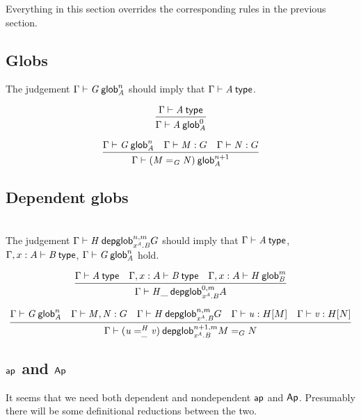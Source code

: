 Everything in this section overrides the corresponding rules in the previous
section.

\subsection{Globs}

The judgement $\text{\ensuremath{\Gamma}} \vdash \mathit{G} \: \mathsf{glob}^{n}_{\mathit{A}}$ should imply that
$\text{\ensuremath{\Gamma}} \vdash \mathit{A} \: \mathsf{type}$.

\begin{small}
  \[\infer{\wfglob{\Gamma}{A}{0}{A}} {\wftype{\Gamma}{A}}\]

  \[\infer{\wfglob{\Gamma}{(\homj{G}{M}{N})}{n+1}{A}} {\wfglob{\Gamma}{G}{n}{A}
    & \ofglob{\Gamma}{M}{G} & \ofglob{\Gamma}{N}{G}}\]
\end{small}

\subsection{Dependent globs}

\\

The judgement $\text{\ensuremath{\Gamma}} \vdash \mathit{H} \: \mathsf{depglob}^{n,m}_{\mathit{x^A.B}}{G}$ should imply that
$\text{\ensuremath{\Gamma}} \vdash \mathit{A} \: \mathsf{type}$, $\text{\ensuremath{\Gamma,x:A}} \vdash \mathit{B} \: \mathsf{type}$, $\text{\ensuremath{\Gamma}} \vdash \mathit{G} \: \mathsf{glob}^{n}_{\mathit{A}}$ hold.

\begin{small}
  \[\infer{\wfdepglob{\Gamma}{H\blank}{0,m}{x^A.B}{A}}
  {\wftype{\Gamma}{A}
    & \wftype{\Gamma,x:A}{B}
    & \wfglob{\Gamma,x:A}{H}{m}{B}
  }\]

  \[\infer{\wfdepglob{\Gamma}{(\dhomj{H}{u}{v}{\blank})}{n+1,m}
    {x^A.B}{\homj{G}{M}{N}}} {\wfglob{\Gamma}{G}{n}{A} &
    \ofglob{\Gamma}{M,N}{G}
    & \wfdepglob{\Gamma}{H}{n,m}{x^A.B}{G} & \ofdepglob{\Gamma}{u}{H}{M} &
    \ofdepglob{\Gamma}{v}{H}{N} }\]
\end{small}

\subsection{$\mathsf{ap}$ and $\mathsf{Ap}$}

It seems that we need both dependent and nondependent $\mathsf{ap}$ and
$\mathsf{Ap}$. Presumably there will be some definitional reductions between the
two.

